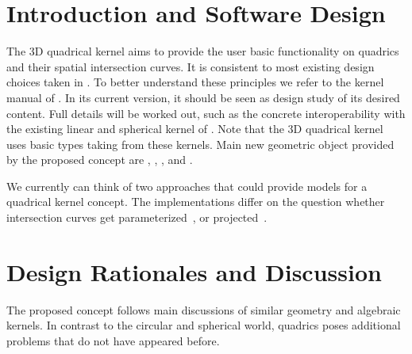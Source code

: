 
\section{Introduction and Software Design}

The 3D quadrical kernel aims to provide the user basic functionality
on quadrics and their spatial intersection curves. It is 
consistent to most existing design choices taken in \cgal. To better
understand these principles we refer to the kernel manual of \cgal.
In its current version, it should be seen as design study of its desired
content. Full details will be worked out, such as the concrete
interoperability with the existing linear and spherical kernel of \cgal.
Note that the 3D quadrical kernel uses basic types taking 
from these kernels. Main new geometric object provided by the proposed
concept are , , ,
 and .

We currently can think of two approaches that
could provide models for a quadrical kernel concept.
The implementations differ on the question whether intersection curves get 
parameterized~\cite{lazard04b}, or projected~\cite{bhksw-eceicpmqic-05}.



\section{Design Rationales and Discussion}

The proposed concept follows main discussions of similar
geometry and algebraic kernels. In contrast to the circular
and spherical world, quadrics poses additional problems that do 
not have appeared before. 

